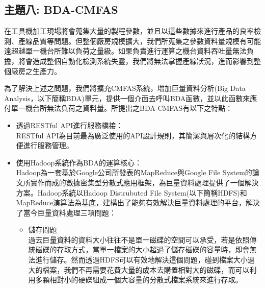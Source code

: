 \documentclass[CJK,12pt,t]{article}
\begin{document}
\begin{CJK*}{UTF8}{bkai}   %









\section{主題八: BDA-CMFAS}


		在工具機加工現場將會蒐集大量的製程參數，並且以這些數據來進行產品的良率檢測、產線品質等問題。但整個廠房規模擴大，我們所蒐集之參數資料量規模有可能遠超越單一機台所難以負荷之量級。如果負責進行運算之機台資料吞吐量無法負擔，將會造成整個自動化檢測系統失靈，我們將無法掌握產線狀況，進而影響到整個廠房之生產力。

		為了解決上述之問題，我們將擴充CMFAS系統，增加巨量資料分析(Big Data Analysis，以下簡稱BDA)單元，提供一個介面去呼叫BDA函數，並以此函數來應付單一機台所無法負荷之資料量。所提出之BDA-CMFAS有以下之特點：
		\begin{itemize}
		\setlength{\itemsep}{5pt}
			\item 透過RESTful API進行服務橋接：\\
				RESTful API為目前最為廣泛使用的API設計規則，其簡潔與層次化的結構方便進行服務管理。
			\item 使用Hadoop系統作為BDA的運算核心：\\
				Hadoop為一套基於Google公司所發表的MapReduce與Google File System的論文所實作而成的數據密集型分散式應用框架，為巨量資料處理提供了一個解決方案。Hadoop系統以Hadoop Distrubuted File System(以下簡稱HDFS)和MapReduce演算法為基底，建構出了能夠有效解決巨量資料處理的平台，解決了當今巨量資料處理三項問題：
					\begin{itemize}
					\setlength{\itemsep}{5pt}
						\item 儲存問題\\
							過去巨量資料的資料大小往往不是單一磁碟的空間可以承受，若是依照傳統磁碟的存取方式，當單一檔案的大小超過了儲存磁碟的容量時，即會無法進行儲存。然而透過HDFS可以有效地解決這個問題，碰到檔案大小過大的檔案，我們不再需要花費大量的成本去購置相對大的磁碟，而可以利用多顆相對小的硬碟組成一個大容量的分散式檔案系統來進行存取。


\end{itemize}
\end{itemize}
\end{CJK*}
\end{document}
